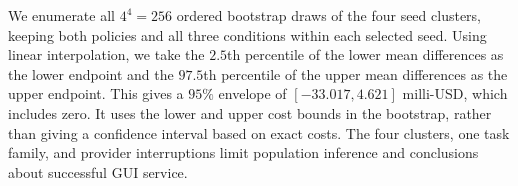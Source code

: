 We enumerate all $4^4=256$ ordered bootstrap draws of the four seed clusters, keeping both policies and all three conditions within each selected seed.
Using linear interpolation, we take the $2.5$th percentile of the lower mean differences as the lower endpoint and the $97.5$th percentile of the upper mean differences as the upper endpoint.
This gives a $95\%$ envelope of $[-33.017,4.621]$ milli-USD, which includes zero.
It uses the lower and upper cost bounds in the bootstrap, rather than giving a confidence interval based on exact costs.
The four clusters, one task family, and provider interruptions limit population inference and conclusions about successful GUI service.
